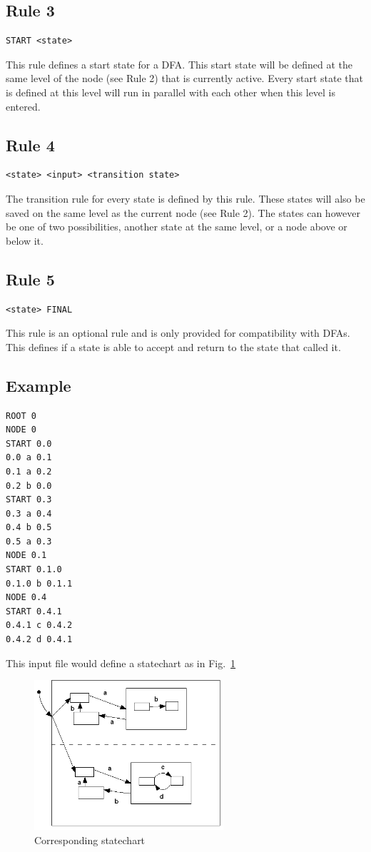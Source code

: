 \documentclass[a4paper,11pt,titlepage]{article}
\begin{document}
\subsection{Rule 3}
\begin{verbatim}
START <state>
\end{verbatim}
This rule defines a start state for a DFA. This start state will be defined at the same level of the node (see Rule 2) that is currently active. Every start state that is defined at this level will run in parallel with each other when this level is entered.

\subsection{Rule 4}
\begin{verbatim}
<state> <input> <transition state> 
\end{verbatim}
The transition rule for every state is defined by this rule. These states will also be saved on the same level as the current node (see Rule 2). The states can however be one of two possibilities, another state at the same level, or a node above or below it.

\subsection{Rule 5}
\begin{verbatim}
<state> FINAL
\end{verbatim}
This rule is an optional rule and is only provided for compatibility with DFAs. This defines if a state is able to accept and return to the state that called it.

\subsection{Example}
\begin{verbatim}
ROOT 0
NODE 0
START 0.0
0.0 a 0.1
0.1 a 0.2
0.2 b 0.0
START 0.3
0.3 a 0.4
0.4 b 0.5
0.5 a 0.3
NODE 0.1
START 0.1.0
0.1.0 b 0.1.1
NODE 0.4
START 0.4.1
0.4.1 c 0.4.2
0.4.2 d 0.4.1
\end{verbatim}
This input file would define a statechart as in Fig.~\ref{Figure:example}

\begin{figure}[htbp]
   \centering
   \includegraphics[width=7cm]{example.png}
   \caption{Corresponding statechart}
   \label{Figure:example}
\end{figure}
\end{document}
